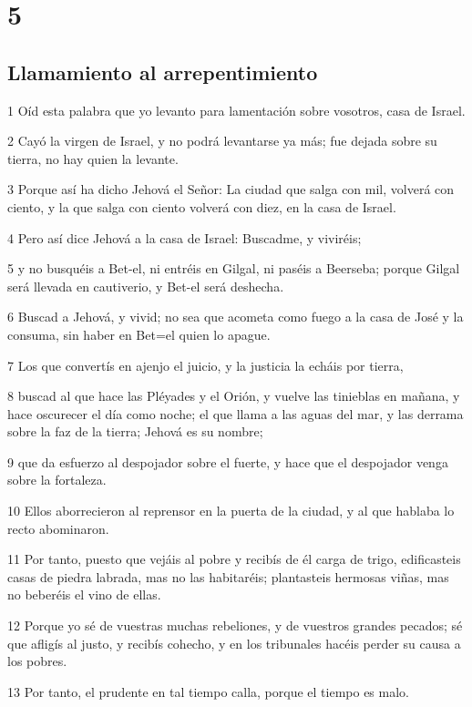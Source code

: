 \chapter{5}

\section*{Llamamiento al arrepentimiento}

\par 1 Oíd esta palabra que yo levanto para lamentación sobre vosotros, casa de Israel.
\par 2 Cayó la virgen de Israel, y no podrá levantarse ya más; fue dejada sobre su tierra, no hay quien la levante.
\par 3 Porque así ha dicho Jehová el Señor: La ciudad que salga con mil, volverá con ciento, y la que salga con ciento volverá con diez, en la casa de Israel.
\par 4 Pero así dice Jehová a la casa de Israel: Buscadme, y viviréis;
\par 5 y no busquéis a Bet-el, ni entréis en Gilgal, ni paséis a Beerseba; porque Gilgal será llevada en cautiverio, y Bet-el será deshecha.
\par 6 Buscad a Jehová, y vivid; no sea que acometa como fuego a la casa de José y la consuma, sin haber en Bet=el quien lo apague.
\par 7 Los que convertís en ajenjo el juicio, y la justicia la echáis por tierra,
\par 8 buscad al que hace las Pléyades y el Orión, y vuelve las tinieblas en mañana, y hace oscurecer el día como noche; el que llama a las aguas del mar, y las derrama sobre la faz de la tierra; Jehová es su nombre;
\par 9 que da esfuerzo al despojador sobre el fuerte, y hace que el despojador venga sobre la fortaleza.
\par 10 Ellos aborrecieron al reprensor en la puerta de la ciudad, y al que hablaba lo recto abominaron.
\par 11 Por tanto, puesto que vejáis al pobre y recibís de él carga de trigo, edificasteis casas de piedra labrada, mas no las habitaréis; plantasteis hermosas viñas, mas no beberéis el vino de ellas.
\par 12 Porque yo sé de vuestras muchas rebeliones, y de vuestros grandes pecados; sé que afligís al justo, y recibís cohecho, y en los tribunales hacéis perder su causa a los pobres.
\par 13 Por tanto, el prudente en tal tiempo calla, porque el tiempo es malo.
